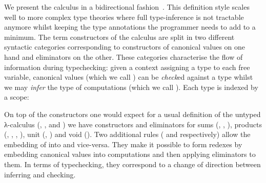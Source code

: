 \documentclass[a4paper,UKenglish]{lipics-v2016}
\begin{document}

We present the calculus in a bidirectional fashion~\cite{pierce2000local}.
This definition style scales well to more complex type theories where full
type-inference is not tractable anymore whilst keeping the type annotations
the programmer needs to add to a minimum. The term constructors of the calculus
are split in two different syntactic categories corresponding to constructors
of canonical values on one hand and eliminators on the other. These categories
characterise the flow of information during typechecking: given a context
assigning a type to each free variable, canonical values (which we call \Checkable{})
can be \emph{check}ed against a type whilst we may \emph{infer} the type of
computations (which we call \Inferable{}). Each type is indexed by a scope:


On top of the constructors one would expect for a usual definition of
the untyped λ-calculus (\var{\cdot}, \app{\cdot}{\cdot}, and \lam{\cdot})
we have constructors and eliminators for sums (\inl{\cdot}, \inr{\cdot},
\cas{\cdot}{\cdot}{\cdot}{\cdot}), products (\prd{\cdot}, ,
\prl{\cdot}, \prr{\cdot}), unit (\uni{}, )
and void (\exf{\cdot}{\cdot}). Two additional rules (\neu{\cdot} and
\cut{\cdot}{\cdot} respectively) allow the embedding of \Inferable{}
into \Checkable{} and vice-versa. They make it possible to form redexes
by embedding canonical values into computations and then applying
eliminators to them. In terms of typechecking, they correspond to a
change of direction between inferring and checking.
\end{document}
